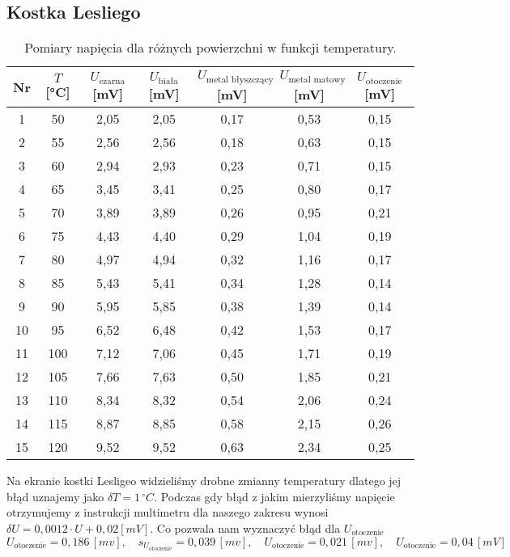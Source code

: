 \documentclass[12pt]{article}
\begin{document}
\subsection{Kostka Lesliego}
\begin{table}[H]
    \centering
    \begin{tabular}{c|c|cccc|c}
        \toprule
        Nr & $T$ [°C] & $U_\text{czarna}$ [mV] & $U_\text{biała}$ [mV] & $U_\text{metal błyszczący}$ [mV] & $U_\text{metal matowy}$ [mV] & $U_\text{otoczenie}$ [mV] \\
        \midrule
        1  & 50  & 2{,}05 & 2{,}05 & 0{,}17 & 0{,}53 & 0{,}15 \\
        2  & 55  & 2{,}56 & 2{,}56 & 0{,}18 & 0{,}63 & 0{,}15 \\
        3  & 60  & 2{,}94 & 2{,}93 & 0{,}23 & 0{,}71 & 0{,}15 \\
        4  & 65  & 3{,}45 & 3{,}41 & 0{,}25 & 0{,}80 & 0{,}17 \\
        5  & 70  & 3{,}89 & 3{,}89 & 0{,}26 & 0{,}95 & 0{,}21 \\
        6  & 75  & 4{,}43 & 4{,}40 & 0{,}29 & 1{,}04 & 0{,}19 \\
        7  & 80  & 4{,}97 & 4{,}94 & 0{,}32 & 1{,}16 & 0{,}17 \\
        8  & 85  & 5{,}43 & 5{,}41 & 0{,}34 & 1{,}28 & 0{,}14 \\
        9  & 90  & 5{,}95 & 5{,}85 & 0{,}38 & 1{,}39 & 0{,}14 \\
        10 & 95  & 6{,}52 & 6{,}48 & 0{,}42 & 1{,}53 & 0{,}17 \\
        11 & 100 & 7{,}12 & 7{,}06 & 0{,}45 & 1{,}71 & 0{,}19 \\
        12 & 105 & 7{,}66 & 7{,}63 & 0{,}50 & 1{,}85 & 0{,}21 \\
        13 & 110 & 8{,}34 & 8{,}32 & 0{,}54 & 2{,}06 & 0{,}24 \\
        14 & 115 & 8{,}87 & 8{,}85 & 0{,}58 & 2{,}15 & 0{,}26 \\
        15 & 120 & 9{,}52 & 9{,}52 & 0{,}63 & 2{,}34 & 0{,}25 \\
        \bottomrule
    \end{tabular}
    \caption{Pomiary napięcia dla różnych powierzchni w funkcji temperatury.}
    \label{tab:cube_measurements}
\end{table}
Na ekranie kostki Lesligeo widzieliśmy drobne zmianny temperatury dlatego jej błąd uznajemy jako $\delta T = 1 \, ^{\circ}C$.
Podczas gdy błąd z jakim mierzyliśmy napięcie otrzymujemy z instrukcji multimetru \cite{radiation_multimeter} dla naszego zakresu wynosi $\delta U = 0{,}0012 \cdot U + 0{,}02 [mV]$.
Co pozwala nam wyznaczyć błąd dla $U_\text{otoczenie}$
\begin{equation}
    U_\text{otoczenie} = 0{,}186 \, [mv], \quad s_{U_\text{otoczenie}} = 0{,}039 \, [mv], \quad U_\text{otoczenie} = 0{,}021 \, [mv], \quad U_\text{otoczenie} = 0{,}04 \, [mV]
    \label{eq:cube_combined_environment}
\end{equation}
\end{document}
